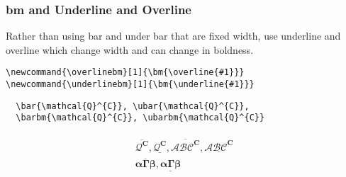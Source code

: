 \documentclass[12pt,english]{article}
\begin{document}
\subsubsection{bm and Underline and Overline}

Rather than using bar and under bar that are fixed width, use underline and overline which change width and can change in boldness.

\newcommand{\overlinebm}[1]{\bm{\overline{#1}}}
\newcommand{\underlinebm}[1]{\bm{\underline{#1}}}
\begin{verbatim}
\newcommand{\overlinebm}[1]{\bm{\overline{#1}}}
\newcommand{\underlinebm}[1]{\bm{\underline{#1}}}
\end{verbatim}

\begin{verbatim}
  \bar{\mathcal{Q}^{C}}, \ubar{\mathcal{Q}^{C}},
  \barbm{\mathcal{Q}^{C}}, \ubarbm{\mathcal{Q}^{C}}
\end{verbatim}
\begin{align}
    \begin{gathered}
      \overlinebm{\mathcal{Q}^{C}}, \underlinebm{\mathcal{Q}^{C}}, \overlinebm{\mathcal{ABC}^{C}}, \underlinebm{\mathcal{ABC}^{C}}\\
      \overlinebm{\alpha\Gamma\beta}, \underlinebm{\alpha\Gamma\beta}\\
    \end{gathered}
\end{align}
\end{document}
